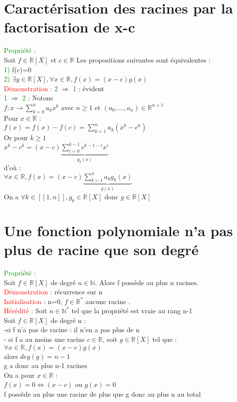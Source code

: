 \documentclass{article}
\begin{document}
	\section{Caractérisation des racines par la factorisation de x-c}
	\textcolor{green}{Propriété :} \\
	Soit $f \in \mathbb{R}[X]$ et $c \in \mathbb{R}$ Les propositions suivantes sont équivalentes : \\
	\textcolor{green}{1)} f(c)=0 \\
	\textcolor{green}{2)} $\exists y \in \mathbb{R}[X], \forall x \in \mathbb{R}, f(x)= (x-c) g(x)$ \\
	\textcolor{red}{Démonstration :} \textcolor{green}{2 }$\Rightarrow$ \textcolor{green}{ 1} : évident \\
	\textcolor{green}{1} $\Rightarrow$ \textcolor{green}{2} : Notons \\
	$f:x \rightarrow \sum_{k=0}^n a_k x^k$ avec $ n\geq 1$ et $( a_0,...,a_n) \in \mathbb{R}^{n+1}$ \\
	Pour $x \in \mathbb{R}$ : \\
	$f(x)=f(x)-f(c) = \sum_{k=1}^n a_k (x^k-c^k)$ \\
	Or pour $ k \geq 1$ \\
	$x^k-c^k=(x-c) \underbrace{\sum_{i=0}^{k-1} c^{k-1-i}x^{i}}_{g_k(x)}$ \\
	d'où : \\
	$\forall x \in \mathbb{R}, f(x)=(x-c) \underbrace{\sum_{k=1}^n a_k g_k(x)}_{g(x)}$ \\
	On a $\forall k \in [[1,n]], g_k \in \mathbb{R}[X]$ donc $g \in \mathbb{R}[X]$
	\section{Une fonction polynomiale n'a pas plus de racine que son degré}
	\textcolor{green}{Propriété :} \\
	Soit $f \in \mathbb{R}[X]$ de degré $n \in \mathbb{N}$. Alors f possède au plus n racines. \\
	\textcolor{red}{Démonstration} : récurrence sur n \\
	\textcolor{red}{Initialisation} : n=0, $f \in \mathbb{R}^*$ aucune racine . \\
	\textcolor{red}{Hérédité :} Soit $ n \in \mathbb{N}^*$ tel que la propriété est vraie au rang n-1 \\
	Soit $ f \in \mathbb{R}[X]$ de degré n : \\
	-si f n'a pas de racine : il n'en a pas plus de n\\
	- si f a au moins une racine $c \in \mathbb{R}$,
		soit $g \in \mathbb{R}[X]$ tel que : \\
		$\forall x \in \mathbb{R}, f(x)=(x-c)g(x)$ \\
		alors $deg(g)=n-1$ \\
			g a donc au plus n-1 racines \\
			On a pour $x \in \mathbb{R}$ : \\
				$f(x)=0 \Leftrightarrow (x-c)$ ou $g(x)=0$ \\
			f possède au plus une racine de plus que g donc au plus n au total
\end{document}
